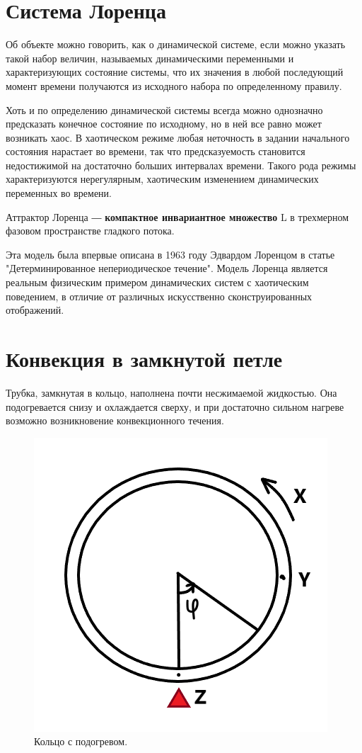 \documentclass[12pt]{article}
\begin{document}

\newpage

\section{Система Лоренца}

Об объекте можно говорить, как о динамической системе, если можно указать такой набор величин, называемых динамическими переменными и характеризующих состояние системы, что их значения в любой последующий момент времени получаются из исходного набора по определенному правилу.

Хоть и по определению динамической системы всегда можно однозначно предсказать конечное состояние по исходному, но в ней все равно может возникать хаос. В хаотическом режиме любая неточность в задании начального состояния нарастает во времени, так что предсказуемость становится недостижимой на достаточно больших интервалах времени. Такого рода режимы характеризуются нерегулярным, хаотическим изменением динамических переменных во времени.

Аттрактор Лоренца ― \textbf{компактное инвариантное множество} L в трехмерном фазовом пространстве гладкого потока.

Эта модель была впервые описана в 1963 году Эдвардом Лоренцом в статье "Детерминированное непериодическое течение". Модель Лоренца является реальным физическим примером динамических систем с хаотическим поведением, в отличие от различных искусственно сконструированных отображений.

\section{Конвекция в замкнутой петле}

Трубка, замкнутая в кольцо, наполнена почти несжимаемой жидкостью. Она подогревается снизу и охлаждается сверху, и при достаточно сильном нагреве возможно возникновение конвекционного течения.

\begin{figure}[h]
	\centering
 	\includegraphics[scale=0.5]{Lorenz.png}
 	\caption{Кольцо с подогревом.}
  	\label{fig:boat1}
\end{figure}
\end{document}
